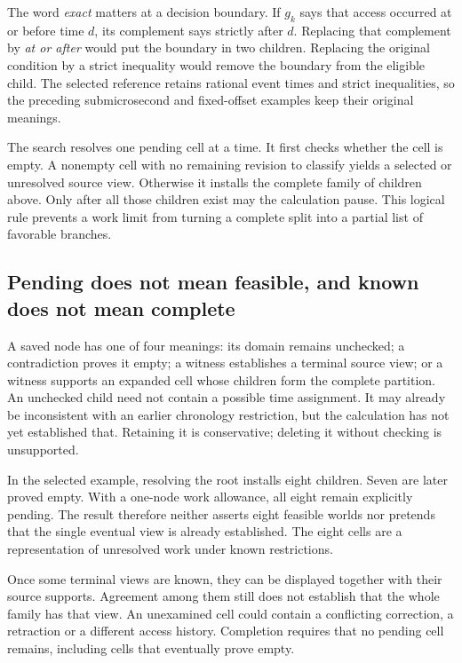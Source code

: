 The word \emph{exact} matters at a decision boundary. If $g_k$ says that access occurred at or before time $d$, its complement says strictly after $d$. Replacing that complement by \emph{at or after} would put the boundary in two children. Replacing the original condition by a strict inequality would remove the boundary from the eligible child. The selected reference retains rational event times and strict inequalities, so the preceding submicrosecond and fixed-offset examples keep their original meanings.

The search resolves one pending cell at a time. It first checks whether the cell is empty. A nonempty cell with no remaining revision to classify yields a selected or unresolved source view. Otherwise it installs the complete family of children above. Only after all those children exist may the calculation pause. This logical rule prevents a work limit from turning a complete split into a partial list of favorable branches.

\subsection{Pending does not mean feasible, and known does not mean complete}

A saved node has one of four meanings: its domain remains unchecked; a contradiction proves it empty; a witness establishes a terminal source view; or a witness supports an expanded cell whose children form the complete partition. An unchecked child need not contain a possible time assignment. It may already be inconsistent with an earlier chronology restriction, but the calculation has not yet established that. Retaining it is conservative; deleting it without checking is unsupported.

In the selected example, resolving the root installs eight children. Seven are later proved empty. With a one-node work allowance, all eight remain explicitly pending. The result therefore neither asserts eight feasible worlds nor pretends that the single eventual view is already established. The eight cells are a representation of unresolved work under known restrictions.

Once some terminal views are known, they can be displayed together with their source supports. Agreement among them still does not establish that the whole family has that view. An unexamined cell could contain a conflicting correction, a retraction or a different access history. Completion requires that no pending cell remains, including cells that eventually prove empty.

